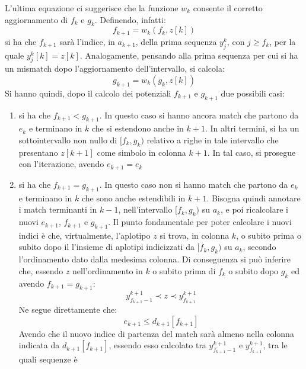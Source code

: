 L'ultima equazione ci suggerisce che la funzione $w_k$
consente il corretto aggiornamento di $f_k$ e $g_k$.
Definendo, infatti:
\begin{equation}
  \label{eq:pbwtq5}
  f_{k+1}=w_k(f_k,z[k])
\end{equation}
si ha che $f_{k+1}$ sarà l'indice, in $a_{k+1}$, della prima sequenza $y_j^k$,
con $j\geq f_k$, per la quale $y_j^k[k]=z[k]$. Analogamente, pensando alla prima
sequenza per cui si ha un mismatch dopo l'aggiornamento dell'intervallo, si
calcola: 
\begin{equation}
  \label{eq:pbwtq6}
  g_{k+1}=w_k(g_k,z[k])
\end{equation}
Si hanno quindi, dopo il calcolo dei potenziali $f_{k+1}$ e $g_{k+1}$ due
possibili casi: 
\begin{enumerate}
  \item si ha che $f_{k+1}<g_{k+1}$. In questo caso si hanno ancora match che
  partono da $e_k$ e terminano in $k$ che si estendono anche in $k+1$. In altri
  termini, si 
  ha un sottointervallo non nullo di $[f_k, g_k)$ relativo a righe in tale
  intervallo che 
  presentano $z[k+1]$ come simbolo in colonna $k+1$. In tal caso, si
  prosegue con l'iterazione, avendo $e_{k+1}=e_k$
  \item si ha che $f_{k+1}=g_{k+1}$. In questo caso non si hanno match che
  partono da $e_k$ e terminano in $k$ che sono anche estendibili in
  $k+1$. Bisogna quindi 
  annotare i match terminanti in $k-1$, nell'intervallo $[f_k,g_k)$ su $a_k$,
  e poi ricalcolare i nuovi $e_{k+1}$, $f_{k+1}$ e $g_{k+1}$. Il punto
  fondamentale per poter calcolare i nuovi indici è 
  che, virtualmente, l'aplotipo $z$ si trova, in colonna $k$, o subito prima o
  subito dopo il l'insieme di aplotipi indicizzati da $[f_k,g_k)$ su $a_k$,
  secondo 
  l'ordinamento dato dalla medesima colonna. Di conseguenza si può inferire che,
  essendo $z$
  nell'ordinamento in $k$ o subito prima di $f_{k}$ o subito dopo $g_k$ ed
  avendo $f_{k+1}=g_{k+1}$: 
  \begin{equation}
    \label{eq:pbwtsmem1}
    y_{f_{k+1}-1}^{k+1}\prec z\prec y_{f_{k+1}}^{k+1}
  \end{equation}
  Ne segue direttamente che:
  \begin{equation}
    \label{eq:pbwtsmem2}
    e_{k+1}\leq d_{k+1}[f_{k+1}]
  \end{equation}
  Avendo che il nuovo indice di partenza del match sarà almeno nella colonna
  indicata da $d_{k+1}[f_{k+1}]$, essendo esso calcolato tra $
  y_{f_{k+1}-1}^{k+1}$ e $ y_{f_{k+1}}^{k+1}$, tra le quali sequenze è

\end{enumerate}
